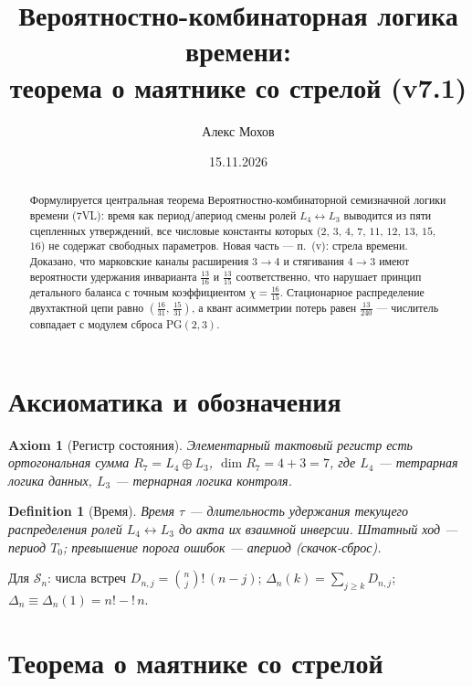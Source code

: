 \documentclass[11pt,a4paper]{article}
\newtheorem{definition}[theorem]{Definition}
\newtheorem{axiom}{Axiom}
\newcommand{\subfact}{\mathord{!}\,}
\newcommand{\S}{\mathcal{S}}
\begin{document}
\title{Вероятностно-комбинаторная логика времени:\\
теорема о маятнике со стрелой (v7.1)}
\author{Алекс Мохов}
\date{15.11.2026}

\maketitle

\begin{abstract}
Формулируется центральная теорема Вероятностно-комбинаторной семизначной логики
времени (7VL): время как период/апериод смены ролей $L_4 \leftrightarrow L_3$
выводится из пяти сцепленных утверждений, все числовые константы которых
($2$, $3$, $4$, $7$, $11$, $12$, $13$, $15$, $16$) не содержат свободных
параметров. Новая часть --- п.~(v): стрела времени. Доказано, что марковские
каналы расширения $3 \to 4$ и стягивания $4 \to 3$ имеют вероятности удержания
инварианта $\frac{13}{16}$ и $\frac{13}{15}$ соответственно, что нарушает
принцип детального баланса с точным коэффициентом $\chi = \frac{16}{15}$.
Стационарное распределение двухтактной цепи равно
$\left(\frac{16}{31},\,\frac{15}{31}\right)$, а квант асимметрии потерь равен
$\frac{13}{240}$ --- числитель совпадает с модулем сброса PG$(2,3)$.
\end{abstract}

\section{Аксиоматика и обозначения}

\begin{axiom}[Регистр состояния]
Элементарный тактовый регистр есть ортогональная сумма
$R_7 = L_4 \oplus L_3$, $\dim R_7 = 4 + 3 = 7$, где $L_4$ --- тетрарная логика
данных, $L_3$ --- тернарная логика контроля.
\end{axiom}

\begin{definition}[Время]
Время $\tau$ --- длительность удержания текущего распределения ролей
$L_4 \leftrightarrow L_3$ до акта их взаимной инверсии. Штатный ход ---
период $T_0$; превышение порога ошибок --- апериод (скачок-сброс).
\end{definition}

Для $\S_n$: числа встреч $D_{n,j} = \binom{n}{j}\subfact{(n-j)}$;
$\Delta_n(k) = \sum_{j \ge k} D_{n,j}$; $\Delta_n \equiv \Delta_n(1) = n! - \subfact{n}$.

\section{Теорема о маятнике со стрелой}
\end{document}

